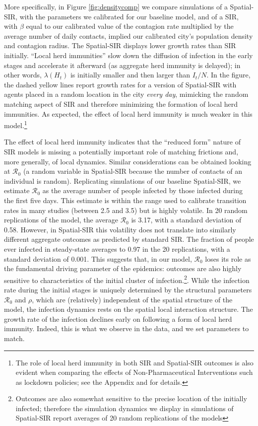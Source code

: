 \documentclass[english,11pt]{article}
\begin{document}
More specifically, in Figure \ref{fig:densitycomp} we compare simulations of  
a Spatial-SIR, 
with the parameters we calibrated for our baseline model, and of a SIR, with $\beta$ equal to our calibrated value of the contagion rate multiplied by the average number of daily contacts, implied our calibrated city's population density and contagion radius. 
 The Spatial-SIR displays lower growth rates than SIR initially. ``Local herd immunities'' slow down the diffusion of infection in the early stages and accelerate it afterward (as aggregate herd immunity is delayed); in other words,   $\lambda(H_t)$ is initially smaller and then larger than $I_t/N$. In the figure, the dashed yellow lines report growth rates for a version of Spatial-SIR with agents placed in a random location in the city \emph{every day}, mimicking the random matching aspect of SIR and therefore minimizing the formation of local herd immunities. As expected, the  effect of local herd immunity is much weaker in this model.\footnote{
The role of local herd immunity in both SIR and Spatial-SIR outcomes is also evident when comparing the effects of Non-Pharmaceutical Interventions such as lockdown policies; see the Appendix and \cite{bisinmoro2020} for details.
}   

The effect of local herd immunity indicates that the ``reduced form'' nature of SIR models is missing a potentially important role of matching frictions and, more generally, of local dynamics. Similar considerations can be obtained looking at $\mathcal{R}_0$  (a random variable in Spatial-SIR because the number of contacts of an individual is random).  Replicating simulations of our baseline Spatial-SIR, we estimate \textbf{$\mathcal{R}_0$} as the average number of people infected 
by those infected during the first five days. 
This estimate is within
the range used to calibrate transition rates in many
studies (between 2.5 and 3.5) but is highly volatile. In 20 random replications of the model, the average $\mathcal{R}_0$ is 3.17, with a standard deviation of 0.58.
However, in Spatial-SIR this volatility does not translate into similarly different aggregate outcomes as predicted by standard SIR. The fraction of people ever infected in steady-state averages to 0.97 in the 20 replications, with a standard deviation of 0.001. This suggests that, in our model, $\mathcal{R}_0$ loses its role as the fundamental driving parameter of the epidemics: outcomes are also highly sensitive to characteristics of the
initial cluster of infection.\footnote{Outcomes are also somewhat sensitive to the precise location of the initially infected; therefore the simulation dynamics we display in simulations of Spatial-SIR report averages of 20 random replications of the models}.
While the infection rate during the initial stages is uniquely determined by the structural parameters  $\mathcal{R}_0$ and $\rho$, which are (relatively) independent of the spatial structure of the model,  the infection dynamics rests on the spatial local interaction structure. The growth rate of the infection declines early on following a form of local herd immunity. Indeed, this is what we observe in the data, and we set parameters to match.
\end{document}
